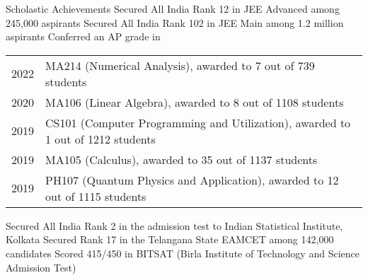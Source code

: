 
\begin{rubric}{Scholastic Achievements}
    \entry*[2019] Secured All India Rank 12 in JEE Advanced among 245,000 aspirants
    \entry*[2019\phantom{}] Secured All India Rank 102 in JEE Main among 1.2 million aspirants
    \entry* Conferred an AP grade in
        
        \begin{tabular}{@{}ll}
           2022 & MA214 (Numerical Analysis), awarded to 7 out of 739 students \\
           2020 & MA106 (Linear Algebra), awarded to 8 out of 1108 students \\
           2019 & CS101 (Computer Programming and Utilization), awarded to 1 out of 1212 students \\
           2019 & MA105 (Calculus), awarded to 35 out of 1137 students \\
           2019 & PH107 (Quantum Physics and Application), awarded to 12 out of 1115 students \\
        \end{tabular}
    \entry*[2019] Secured All India Rank 2 in the admission test to Indian Statistical Institute, Kolkata
    \entry*[2019\phantom{}] Secured Rank 17 in the Telangana State EAMCET among 142,000 candidates
    \entry*[2019] Scored 415/450 in BITSAT (Birla Institute of Technology and Science Admission Test)
\end{rubric}